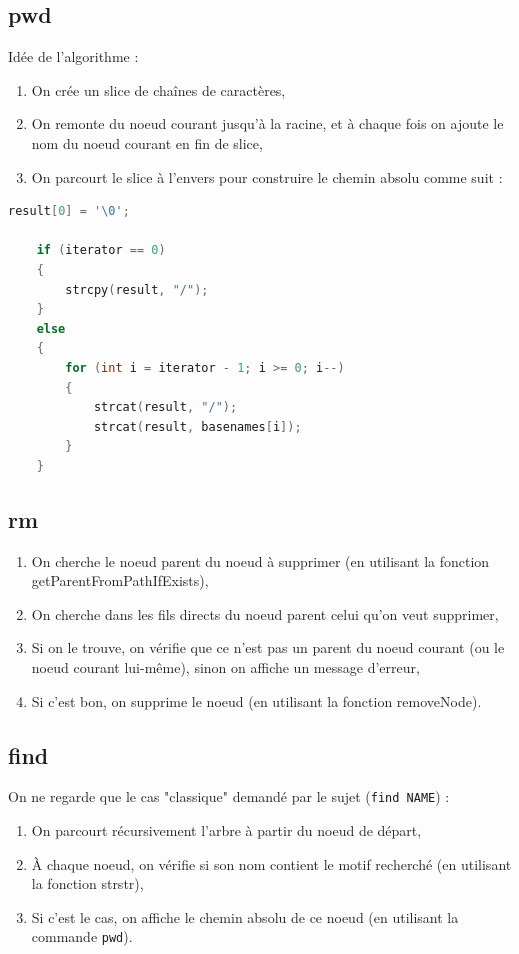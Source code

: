 \documentclass{article}
\begin{document}
\subsection{pwd}

Idée de l'algorithme :
\begin{enumerate}
    \item On crée un slice de chaînes de caractères,
    \item On remonte du noeud courant jusqu'à la racine, et à chaque fois on ajoute le nom du noeud courant en fin de slice,
    \item On parcourt le slice à l'envers pour construire le chemin absolu comme suit :
\end{enumerate}

\begin{lstlisting}[language=C]
    result[0] = '\0';

    if (iterator == 0)
    {
        strcpy(result, "/");
    }
    else
    {
        for (int i = iterator - 1; i >= 0; i--)
        {
            strcat(result, "/");
            strcat(result, basenames[i]);
        }
    }
\end{lstlisting}

\subsection{rm}

\begin{enumerate}
    \item On cherche le noeud parent du noeud à supprimer (en utilisant la fonction getParentFromPathIfExists),
    \item On cherche dans les fils directs du noeud parent celui qu'on veut supprimer,
    \item Si on le trouve, on vérifie que ce n'est pas un parent du noeud courant (ou le noeud courant lui-même), sinon on affiche un message d'erreur,
    \item Si c'est bon, on supprime le noeud (en utilisant la fonction removeNode).
\end{enumerate}

\subsection{find}

On ne regarde que le cas "classique" demandé par le sujet (\texttt{find NAME}) :

\begin{enumerate}
    \item On parcourt récursivement l'arbre à partir du noeud de départ,
    \item À chaque noeud, on vérifie si son nom contient le motif recherché (en utilisant la fonction strstr),
    \item Si c'est le cas, on affiche le chemin absolu de ce noeud (en utilisant la commande \texttt{pwd}).
\end{enumerate}
\end{document}
